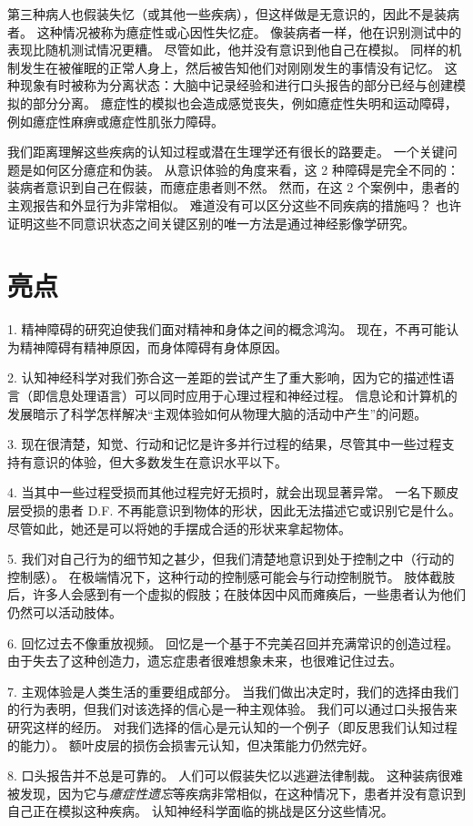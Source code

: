 第三种病人也假装失忆（或其他一些疾病），但这样做是无意识的，因此不是装病者。
这种情况被称为癔症性或心因性失忆症。
像装病者一样，他在识别测试中的表现比随机测试情况更糟。
尽管如此，他并没有意识到他自己在模拟。
同样的机制发生在被催眠的正常人身上，然后被告知他们对刚刚发生的事情没有记忆。
这种现象有时被称为分离状态：大脑中记录经验和进行口头报告的部分已经与创建模拟的部分分离。
癔症性的模拟也会造成感觉丧失，例如癔症性失明和运动障碍，例如癔症性麻痹或癔症性肌张力障碍。


我们距离理解这些疾病的认知过程或潜在生理学还有很长的路要走。
一个关键问题是如何区分癔症和伪装。
从意识体验的角度来看，这 2 种障碍是完全不同的：
装病者意识到自己在假装，而癔症患者则不然。
然而，在这 2 个案例中，患者的主观报告和外显行为非常相似。
难道没有可以区分这些不同疾病的措施吗？
也许证明这些不同意识状态之间关键区别的唯一方法是通过神经影像学研究。



\section{亮点}

1. 精神障碍的研究迫使我们面对精神和身体之间的概念鸿沟。
现在，不再可能认为精神障碍有精神原因，而身体障碍有身体原因。


2. 认知神经科学对我们弥合这一差距的尝试产生了重大影响，因为它的描述性语言（即信息处理语言）可以同时应用于心理过程和神经过程。
信息论和计算机的发展暗示了科学怎样解决“主观体验如何从物理大脑的活动中产生”的问题。


3. 现在很清楚，知觉、行动和记忆是许多并行过程的结果，尽管其中一些过程支持有意识的体验，但大多数发生在意识水平以下。 


4. 当其中一些过程受损而其他过程完好无损时，就会出现显著异常。
一名下颞皮层受损的患者 D.F. 不再能意识到物体的形状，因此无法描述它或识别它是什么。
尽管如此，她还是可以将她的手摆成合适的形状来拿起物体。


5. 我们对自己行为的细节知之甚少，但我们清楚地意识到处于控制之中（行动的控制感）。
在极端情况下，这种行动的控制感可能会与行动控制脱节。
肢体截肢后，许多人会感到有一个虚拟的假肢；在肢体因中风而瘫痪后，一些患者认为他们仍然可以活动肢体。
 

6. 回忆过去不像重放视频。
回忆是一个基于不完美召回并充满常识的创造过程。
由于失去了这种创造力，遗忘症患者很难想象未来，也很难记住过去。


7. 主观体验是人类生活的重要组成部分。
当我们做出决定时，我们的选择由我们的行为表明，但我们对该选择的信心是一种主观体验。
我们可以通过口头报告来研究这样的经历。
对我们选择的信心是元认知的一个例子（即反思我们认知过程的能力）。
额叶皮层的损伤会损害元认知，但决策能力仍然完好。 


8. 口头报告并不总是可靠的。
人们可以假装失忆以逃避法律制裁。
这种装病很难被发现，因为它与\textit{癔症性遗忘}等疾病非常相似，在这种情况下，患者并没有意识到自己正在模拟这种疾病。
认知神经科学面临的挑战是区分这些情况。

